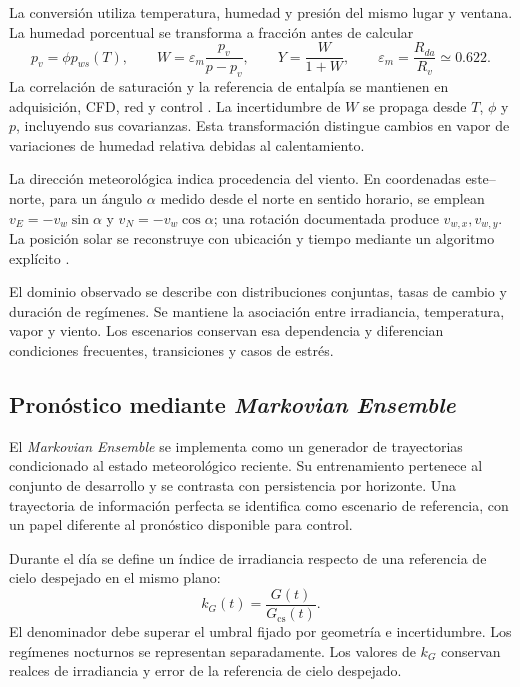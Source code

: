 La conversión utiliza temperatura, humedad y presión del mismo lugar y ventana. La humedad porcentual se transforma a fracción antes de calcular
\begin{equation}
p_v=\phi p_{ws}(T),\qquad
W=\varepsilon_m\frac{p_v}{p-p_v},\qquad
Y=\frac{W}{1+W},\qquad
\varepsilon_m=\frac{R_{da}}{R_v}\simeq0.622.
\label{met:conversion_humedad}
\end{equation}
La correlación de saturación y la referencia de entalpía se mantienen en adquisición, CFD, red y control \cite{ashrae2021}. La incertidumbre de $W$ se propaga desde $T$, $\phi$ y $p$, incluyendo sus covarianzas. Esta transformación distingue cambios en vapor de variaciones de humedad relativa debidas al calentamiento.

La dirección meteorológica indica procedencia del viento. En coordenadas este--norte, para un ángulo $\alpha$ medido desde el norte en sentido horario, se emplean $v_E=-v_w\sin\alpha$ y $v_N=-v_w\cos\alpha$; una rotación documentada produce $v_{w,x},v_{w,y}$. La posición solar se reconstruye con ubicación y tiempo mediante un algoritmo explícito \cite{reda2004}.

El dominio observado se describe con distribuciones conjuntas, tasas de cambio y duración de regímenes. Se mantiene la asociación entre irradiancia, temperatura, vapor y viento. Los escenarios conservan esa dependencia y diferencian condiciones frecuentes, transiciones y casos de estrés.

\subsection{Pronóstico mediante \textit{Markovian Ensemble}}
\label{met:markov}

El \textit{Markovian Ensemble} se implementa como un generador de trayectorias condicionado al estado meteorológico reciente. Su entrenamiento pertenece al conjunto de desarrollo y se contrasta con persistencia por horizonte. Una trayectoria de información perfecta se identifica como escenario de referencia, con un papel diferente al pronóstico disponible para control.

Durante el día se define un índice de irradiancia respecto de una referencia de cielo despejado en el mismo plano:
\begin{equation}
k_G(t)=\frac{G(t)}{G_{\mathrm{cs}}(t)}.
\label{met:indice_cielo}
\end{equation}
El denominador debe superar el umbral fijado por geometría e incertidumbre. Los regímenes nocturnos se representan separadamente. Los valores de $k_G$ conservan realces de irradiancia y error de la referencia de cielo despejado.

